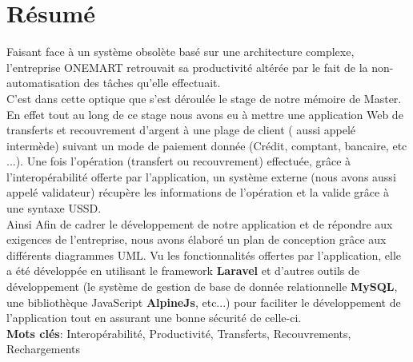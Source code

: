 \chapter*{Résumé}
	\thispagestyle{empty}
	
	
	Faisant face à un système obsolète basé sur une architecture complexe, l'entreprise ONEMART retrouvait sa productivité altérée par le fait de la non-automatisation des tâches qu'elle effectuait.\\
	C'est dans cette optique que s'est déroulée le stage de notre mémoire de Master. En effet tout au long de ce stage nous avons eu à mettre une application Web de transferts et recouvrement d'argent à une plage de client ( aussi appelé intermède) suivant un mode de paiement donnée (Crédit, comptant, bancaire, etc ...). Une fois l'opération (transfert ou recouvrement) effectuée, grâce à l'interopérabilité offerte par l'application, un système externe (nous avons aussi appelé validateur) récupère les informations de l'opération et la valide grâce à une syntaxe USSD.\\
	Ainsi Afin de cadrer le développement de notre application et de répondre aux exigences de l'entreprise, nous avons élaboré un plan de conception grâce aux différents diagrammes UML. Vu les fonctionnalités offertes par l'application, elle a été développée en utilisant le framework \textbf{Laravel} et d'autres outils de développement (le système de gestion de base de donnée relationnelle \textbf{MySQL}, une bibliothèque JavaScript \textbf{AlpineJs}, etc...) pour faciliter le développement de l'application tout en assurant une bonne sécurité de celle-ci.\\
	
	\textbf{Mots clés}: Interopérabilité, Productivité, Transferts, Recouvrements, Rechargements
	
%	